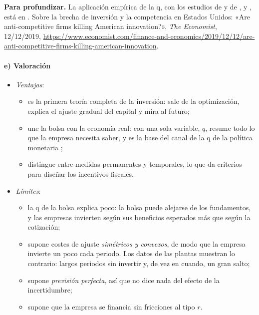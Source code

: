 \documentclass[11pt]{article}
\begin{document}
\begin{anotaciones}
\textbf{Para profundizar.} La aplicación empírica de la q, con los estudios de  y de ,  y , está en \textcite[441-444]{Romer2019Advanced}. Sobre la brecha de inversión y la competencia en Estados Unidos: «Are anti-competitive firms killing American innovation?», \emph{The Economist}, 12/12/2019\nocite{Economist2019Anticompetitive}, \url{https://www.economist.com/finance-and-economics/2019/12/12/are-anti-competitive-firms-killing-american-innovation}.
\end{anotaciones}

\paragraph{e) Valoración}

\begin{itemize}
\item \emph{Ventajas}:
  \begin{itemize}
  \item es la primera teoría completa de la inversión: sale de la optimización, explica el ajuste gradual del capital y mira al futuro;
  \item une la bolsa con la economía real: con una sola variable, $q$, resume todo lo que la empresa necesita saber\nocite{Hayashi1982Tobin}, y es la base del canal de la q de la política monetaria ;
  \item distingue entre medidas permanentes y temporales, lo que da criterios para diseñar los incentivos fiscales.
  \end{itemize}
\item \emph{Límites}:
  \begin{itemize}
  \item la q de la bolsa explica poco: la bolsa puede alejarse de los fundamentos, y las empresas invierten según sus beneficios esperados más que según la cotización\nocite{BlanchardRheeSummers1993Stock};
  \item supone costes de ajuste \emph{simétricos y convexos}, de modo que la empresa invierte un poco cada periodo. Los datos de las plantas muestran lo contrario: largos periodos sin invertir y, de vez en cuando, un gran salto;
  \item supone \emph{previsión perfecta}, así que no dice nada del efecto de la incertidumbre;
  \item supone que la empresa se financia sin fricciones al tipo $r$.
  \end{itemize}
\end{itemize}
\end{document}
